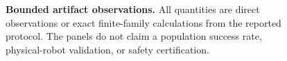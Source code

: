 \begin{figure}[!t]
\centering
\resizebox{\textwidth}{!}{}
\caption{\textbf{Bounded artifact observations.}
All quantities are direct observations or exact finite-family calculations from
the reported protocol.  The panels do not claim a population success rate,
physical-robot validation, or safety certification.}
\label{fig:results}
\end{figure}
